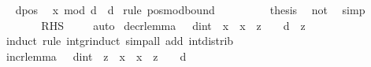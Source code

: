 \begin{isabellebody}
\ \isamarkupfalse%
\ dpos\ \isamarkupfalse%
\ {\isachardoublequoteopen}x\ mod\ d\ {\isacharless}{\kern0pt}\ d{\isachardoublequoteclose}\ \isamarkupfalse%
{\isacharparenleft}{\kern0pt}rule\ pos{\isacharunderscore}{\kern0pt}mod{\isacharunderscore}{\kern0pt}bound{\isacharparenright}{\kern0pt}\isanewline
\ \ \ \ \ \ \isamarkupfalse%
\ \isamarkupfalse%
\ {\isacharquery}{\kern0pt}thesis\ \isamarkupfalse%
\ not{}\ \isamarkupfalse%
\ simp\isanewline
\ \ \ \ \isamarkupfalse%
\isanewline
\ \ \ \ \isamarkupfalse%
\ \isamarkupfalse%
\ {\isacharquery}{\kern0pt}RHS\ \isacommand{{\isachardot}{\kern0pt}{\isachardot}{\kern0pt}}\isamarkupfalse%
\isanewline
\ \ \isamarkupfalse%
\isanewline
{}\isamarkupfalse%
\ auto%
\endisatagproof
{\isafoldproof}%
%
\isadelimproof
%
\endisadelimproof
%
\isadelimdocument
%
\endisadelimdocument
%
\isatagdocument
%
\isamarkuptrue%
%
\endisatagdocument
{\isafolddocument}%
%
\isadelimdocument
%
\endisadelimdocument
{}\isamarkupfalse%
\ decr{\isacharunderscore}{\kern0pt}lemma{\isacharcolon}{\kern0pt}\ {\isachardoublequoteopen}{}\ {\isacharless}{\kern0pt}\ {\isacharparenleft}{\kern0pt}d{\isacharcolon}{\kern0pt}{\isacharcolon}{\kern0pt}int{\isacharparenright}{\kern0pt}\ {\isasymLongrightarrow}\ x\ {\isacharminus}{\kern0pt}\ {\isacharparenleft}{\kern0pt}{\isasymbar}x\ {\isacharminus}{\kern0pt}\ z{\isasymbar}\ {\isacharplus}{\kern0pt}\ {}{\isacharparenright}{\kern0pt}\ {\isacharasterisk}{\kern0pt}\ d\ {\isacharless}{\kern0pt}\ z{\isachardoublequoteclose}\isanewline
%
\isadelimproof
\ \ %
\endisadelimproof
%
\isatagproof
{}\isamarkupfalse%
\ {\isacharparenleft}{\kern0pt}induct\ rule{\isacharcolon}{\kern0pt}\ int{\isacharunderscore}{\kern0pt}gr{\isacharunderscore}{\kern0pt}induct{\isacharparenright}{\kern0pt}\ {\isacharparenleft}{\kern0pt}simp{\isacharunderscore}{\kern0pt}all\ add{\isacharcolon}{\kern0pt}\ int{\isacharunderscore}{\kern0pt}distrib{\isacharparenright}{\kern0pt}%
\endisatagproof
{\isafoldproof}%
%
\isadelimproof
\isanewline
%
\endisadelimproof
\isanewline
{}\isamarkupfalse%
\ incr{\isacharunderscore}{\kern0pt}lemma{\isacharcolon}{\kern0pt}\ {\isachardoublequoteopen}{}\ {\isacharless}{\kern0pt}\ {\isacharparenleft}{\kern0pt}d{\isacharcolon}{\kern0pt}{\isacharcolon}{\kern0pt}int{\isacharparenright}{\kern0pt}\ {\isasymLongrightarrow}\ z\ {\isacharless}{\kern0pt}\ x\ {\isacharplus}{\kern0pt}\ {\isacharparenleft}{\kern0pt}{\isasymbar}x\ {\isacharminus}{\kern0pt}\ z{\isasymbar}\ {\isacharplus}{\kern0pt}\ {}{\isacharparenright}{\kern0pt}\ {\isacharasterisk}{\kern0pt}\ d{\isachardoublequoteclose}\isanewline

\end{isabellebody}
